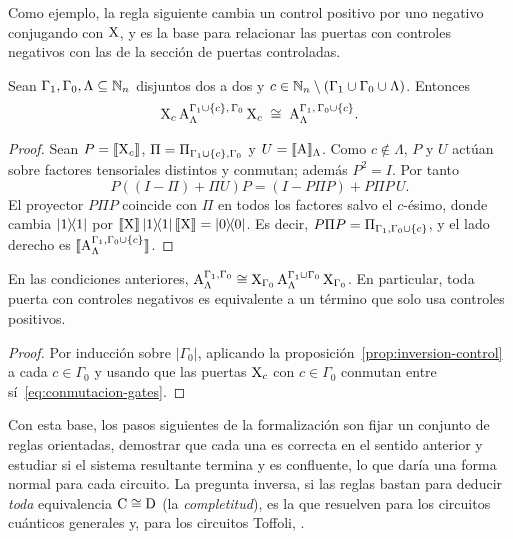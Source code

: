 Como ejemplo, la regla siguiente cambia un control positivo por uno negativo conjugando con $\text{X}$, y es la base para relacionar las puertas con controles negativos con las de la sección de puertas controladas.

\begin{proposition}
  \label{prop:inversion-control}
  Sean $\Gamma_1,\Gamma_0,\Lambda\subseteq\mathbb{N}_n$ disjuntos dos a dos y $c\in\mathbb{N}_n\setminus(\Gamma_1\cup\Gamma_0\cup\Lambda)$. Entonces
  \[
    \text{X}_c\,\text{A}^{\Gamma_1\cup\{c\},\,\Gamma_0}_{\Lambda}\,\text{X}_c
    \;\cong\;
    \text{A}^{\Gamma_1,\,\Gamma_0\cup\{c\}}_{\Lambda}.
  \]
\end{proposition}
\begin{proof}
  Sean $P=\llbracket \text{X}_c\rrbracket$, $\Pi=\Pi_{\Gamma_1\cup\{c\},\Gamma_0}$ y $U=\llbracket \text{A}\rrbracket_\Lambda$. Como $c\notin\Lambda$, $P$ y $U$ actúan sobre factores tensoriales distintos y conmutan; además $P^2=I$. Por tanto
  \[
    P\left((I-\Pi)+\Pi U\right)P = (I-P\Pi P) + P\Pi P\, U.
  \]
  El proyector $P\Pi P$ coincide con $\Pi$ en todos los factores salvo el $c$-ésimo, donde cambia $\dyad{1}$ por $\sem{\gate{X}}\dyad{1}\sem{\gate{X}}=\dyad{0}$. Es decir, $P\Pi P=\Pi_{\Gamma_1,\Gamma_0\cup\{c\}}$, y el lado derecho es $\llbracket \text{A}^{\Gamma_1,\Gamma_0\cup\{c\}}_{\Lambda}\rrbracket$.
\end{proof}

\begin{corollary}
  \label{cor:controles-negativos}
  En las condiciones anteriores,
  $\text{A}^{\Gamma_1,\Gamma_0}_{\Lambda}\cong\text{X}_{\Gamma_0}\,\text{A}^{\Gamma_1\cup\Gamma_0}_{\Lambda}\,\text{X}_{\Gamma_0}$.
  En particular, toda puerta con controles negativos es equivalente a un término que solo usa controles positivos.
\end{corollary}
\begin{proof}
  Por inducción sobre $|\Gamma_0|$, aplicando la proposición~\ref{prop:inversion-control} a cada $c\in\Gamma_0$ y usando que las puertas $\text{X}_c$ con $c\in\Gamma_0$ conmutan entre sí~\eqref{eq:conmutacion-gates}.
\end{proof}

Con esta base, los pasos siguientes de la formalización son fijar un conjunto de reglas orientadas, demostrar que cada una es correcta en el sentido anterior y estudiar si el sistema resultante termina y es confluente, lo que daría una forma normal para cada circuito. La pregunta inversa, si las reglas bastan para deducir \emph{toda} equivalencia $\text{C}\cong\text{D}$ (la \emph{completitud}), es la que resuelven para los circuitos cuánticos generales \textcite{Clement2023} y, para los circuitos Toffoli, \textcite{CockettComfort2018}.
